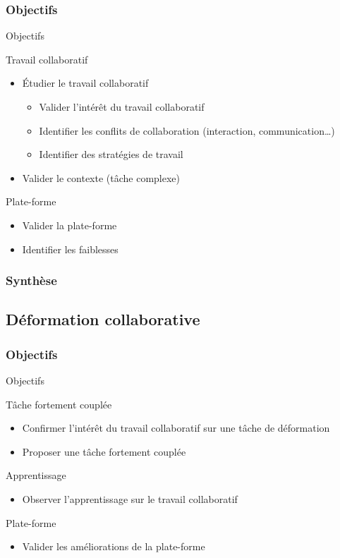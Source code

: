 \documentclass[english,french,dvips]{mybeamer}
\begin{document}
	\subsubsection{Objectifs}
	\begin{frame}{Objectifs}
		\begin{block}{Travail collaboratif}
			\begin{itemize}
				\item Étudier le travail collaboratif
					\begin{itemize}
						\item Valider l'intérêt du travail collaboratif
						\item Identifier les conflits de collaboration (interaction, communication\dots{})
						\item Identifier des stratégies de travail
					\end{itemize}
				\item Valider le contexte (tâche complexe)
			\end{itemize}
		\end{block}
		\begin{block}{Plate-forme}
			\begin{itemize}
				\item Valider la plate-forme
				\item Identifier les faiblesses
			\end{itemize}
		\end{block}
	\end{frame}
	\subsubsection{Synthèse}
	\subsection{Déformation collaborative}
	\subsubsection{Objectifs}
	\begin{frame}{Objectifs}
		\begin{block}{Tâche fortement couplée}
			\begin{itemize}
				\item Confirmer l'intérêt du travail collaboratif sur une tâche de déformation
				\item Proposer une tâche fortement couplée
			\end{itemize}
		\end{block}
		\begin{block}{Apprentissage}
			\begin{itemize}
				\item Observer l'apprentissage sur le travail collaboratif
			\end{itemize}
		\end{block}
		\begin{block}{Plate-forme}
			\begin{itemize}
				\item Valider les améliorations de la plate-forme
			\end{itemize}
		\end{block}
	\end{frame}
\end{document}
